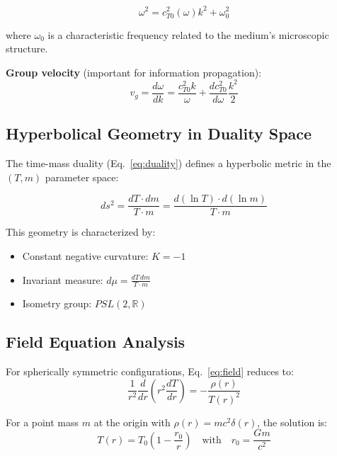 \documentclass[12pt,a4paper]{article}
\begin{document}
	\begin{equation}
		\omega^2 = c_{T0}^2(\omega) k^2 + \omega_0^2
	\end{equation}
	
	where $\omega_0$ is a characteristic frequency related to the medium's microscopic structure.
	
	\textbf{Group velocity} (important for information propagation):
	\begin{equation}
		v_g = \frac{d\omega}{dk} = \frac{c_{T0}^2 k}{\omega} + \frac{dc_{T0}^2}{d\omega} \frac{k^2}{2}
	\end{equation}
	
	\subsection{Hyperbolical Geometry in Duality Space}
	
	The time-mass duality (Eq.~\ref{eq:duality}) defines a hyperbolic metric in the $(T,m)$ parameter space:
	
	\begin{equation}
		ds^2 = \frac{dT \cdot dm}{T \cdot m} = \frac{d(\ln T) \cdot d(\ln m)}{T \cdot m}
	\end{equation}
	
	This geometry is characterized by:
	\begin{itemize}
		\item Constant negative curvature: $K = -1$
		\item Invariant measure: $d\mu = \frac{dT \, dm}{T \cdot m}$
		\item Isometry group: $PSL(2,\mathbb{R})$
	\end{itemize}
	
	\subsection{Field Equation Analysis}
	
	For spherically symmetric configurations, Eq.~\ref{eq:field} reduces to:
	\begin{equation}
		\frac{1}{r^2}\frac{d}{dr}\left(r^2 \frac{dT}{dr}\right) = -\frac{\rho(r)}{T(r)^2}
	\end{equation}
	
	For a point mass $m$ at the origin with $\rho(r) = mc^2 \delta(r)$, the solution is:
	\begin{equation}
		T(r) = T_0 \left(1 - \frac{r_0}{r}\right) \quad \text{with} \quad r_0 = \frac{Gm}{c^2}
	\end{equation}
	
\end{document}
